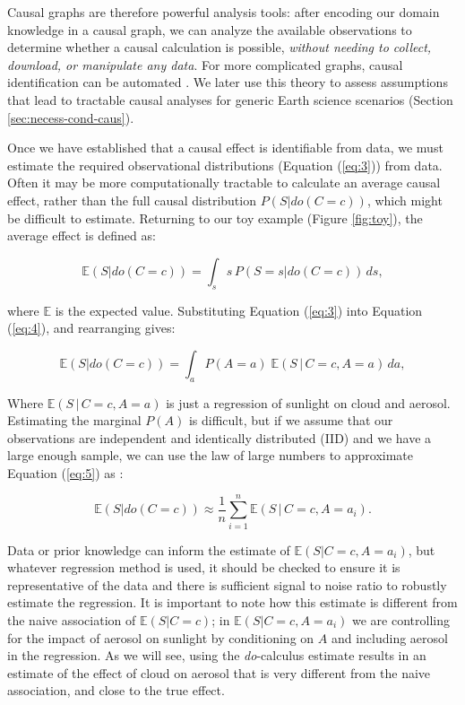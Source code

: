 \documentclass[12pt]{article}
\begin{document}
Causal graphs are therefore powerful analysis tools: after encoding
our domain knowledge in a causal graph, we can analyze the available
observations to determine whether a causal calculation is possible,
\textit{without needing to collect, download, or manipulate any
  data}. For more complicated graphs, causal identification can be
automated \citep[][ and \url{http://www.dagitty.net/},
\url{https://causalfusion.net}]{tian2002general,shpitser2006,huang2006identifiability,Bareinboim7345,
  textor2017}. We later use this theory to assess assumptions that
lead to tractable causal analyses for generic Earth science scenarios
(Section \ref{sec:necess-cond-caus}).

Once we have established that a causal effect is identifiable from
data, we must estimate the required observational distributions
(Equation (\ref{eq:3})) from data. Often it may be more
computationally tractable to calculate an average causal effect,
rather than the full causal distribution $P(S | do(C=c))$, which might be difficult to estimate. Returning
to our toy example (Figure \ref{fig:toy}), the average effect is
defined as:

\begin{equation} \mathbb{E}(S | do(C = c)) = \int_{s} s \, P(S = s |
  do(C=c)) \, ds,
  \label{eq:4}
\end{equation}

where $\mathbb{E}$ is the expected value. Substituting Equation
(\ref{eq:3}) into Equation (\ref{eq:4}), and rearranging gives:

\begin{equation} \mathbb{E}(S | do(C = c)) = \int_{a} P(A=a) \;
  \mathbb{E}(S \, | \, C=c, A=a) \, d a,
  \label{eq:5}
\end{equation}

Where $\mathbb{E}(S \, | \, C=c, A=a)$ is just a regression of
sunlight on cloud and aerosol. Estimating the marginal $P(A)$ is
difficult, but if we assume that our observations are independent and
identically distributed (IID) and we have a large enough sample, we
can use the law of large numbers to approximate Equation (\ref{eq:5})
as \citep{shalizi2013} :

\begin{equation} \mathbb{E}(S | do(C = c)) \approx \frac{1}{n}
  \sum_{i=1}^n \mathbb{E}(S \, | \, C=c, A=a_i).
  \label{eq:6}
\end{equation}

Data or prior knowledge can inform the estimate of
$\mathbb{E}(S | C=c, A=a_i)$, but whatever regression method is used,
it should be checked to ensure it is representative of the data and
there is sufficient signal to noise ratio to robustly estimate the
regression. It is important to note how this estimate is different
from the naive association of $\mathbb{E}(S | C=c)$; in
$\mathbb{E}(S | C=c, A=a_i)$ we are controlling for the impact of
aerosol on sunlight by conditioning on $A$ and including aerosol in
the regression. As we will see, using the \textit{do}-calculus
estimate results in an estimate of the effect of cloud on aerosol that
is very different from the naive association, and close to the true
effect.
\end{document}

